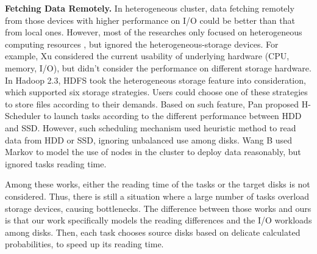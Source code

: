 \documentclass[conference]{IEEEtran}
\begin{document}
\textbf{Fetching Data Remotely.} 
In heterogeneous cluster, data fetching remotely from those devices with higher performance on I/O could be better than that from local ones.
However, most of the researches only focused on heterogeneous computing resources \cite{b25} \cite{b26} \cite{b35} \cite{b36} \cite{b6}, but ignored the heterogeneous-storage devices. For example, Xu \cite{b6} considered the current usability of underlying hardware (CPU, memory, I/O), but didn't consider the performance on different storage hardware. 
In Hadoop 2.3, HDFS\cite{b19} took the heterogeneous storage feature into consideration, which supported six storage strategies. Users could choose one of these strategies to store files according to their demands.
Based on such feature, Pan \cite{b7} proposed H-Scheduler to launch tasks according to the different performance between HDD and SSD. However, such scheduling mechanism used heuristic method to read data from HDD or SSD, ignoring unbalanced use among disks.
Wang B \cite{b8} used Markov to model the use of nodes in the cluster to deploy data reasonably, but ignored tasks reading time. %

Among these works, either the reading time of the tasks or the target disks is not considered. Thus, there is still a situation where a large number of tasks overload storage devices, causing bottlenecks.
The difference between those works and ours is that our work specifically models the reading differences and the I/O workloads among disks. Then, each task chooses source disks based on delicate calculated probabilities, to speed up its reading time.
\end{document}

